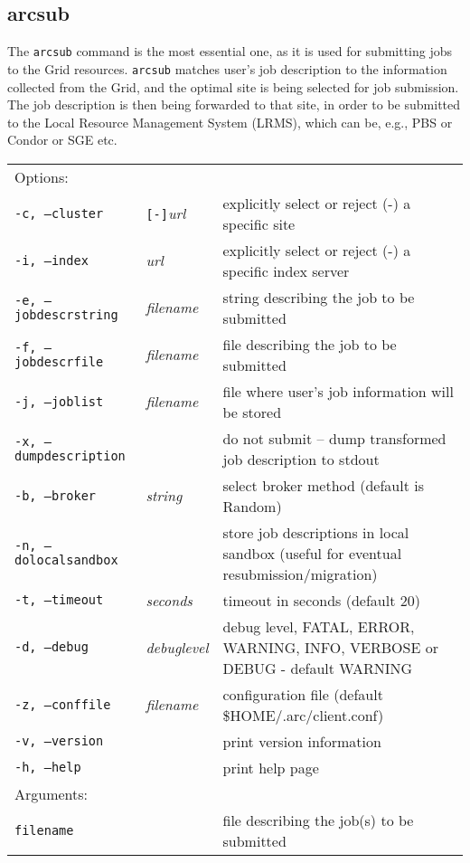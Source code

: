 \subsection{arcsub}\label{sec:arcsub}
The \texttt{arcsub} command is the
most essential one, as it is used for submitting jobs to the Grid
resources. \texttt{arcsub} matches user's job
description to the information collected from the Grid, and the
optimal site is being selected for job submission. The job description
is then being forwarded to that site, in order to be submitted to the
Local Resource Management System (LRMS), which can be, e.g., PBS or
Condor or SGE etc.

\hspace*{0.5cm}
\begin{shaded}
\end{shaded}
\begin{longtable}{llp{8cm}}
   Options:&&\\
   \texttt{-c, --cluster}&\verb#[-]#\textit{url}&explicitly select or reject (-) a specific site\\
   \texttt{-i, --index}&\textit{url}&explicitly select or reject (-) a specific index server\\
   \texttt{-e, --jobdescrstring}&\textit{filename}&string describing the job to be submitted\\
   \texttt{-f, --jobdescrfile}&\textit{filename}&file describing the job to be submitted\\
   \texttt{-j, --joblist}&\textit{filename}&file where user's job information will be stored\\
   \texttt{-x, --dumpdescription}&&do not submit -- dump transformed job description to stdout\\
   \texttt{-b, --broker}&\textit{string}&select broker method (default is Random)\\
   \texttt{-n, --dolocalsandbox}& &store job descriptions in local sandbox (useful for eventual resubmission/migration)\\
   \texttt{-t, --timeout}&\textit{seconds}&timeout in seconds (default 20)\\
   \texttt{-d, --debug}&\textit{debuglevel}&debug level, FATAL, ERROR, WARNING, INFO, VERBOSE or DEBUG - default WARNING\\
   \texttt{-z, --conffile}&\textit{filename}& configuration file (default {\$}HOME/.arc/client.conf)\\
   \texttt{-v, --version}&&print version information\\
   \texttt{-h, --help}&&print help page\\
   Arguments:&&\\
   \texttt{filename}&&file describing the job(s) to be submitted\\
\end{longtable}

